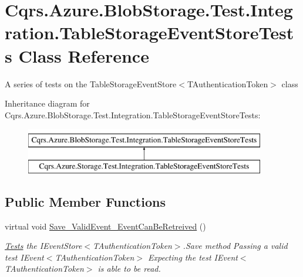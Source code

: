 \hypertarget{classCqrs_1_1Azure_1_1BlobStorage_1_1Test_1_1Integration_1_1TableStorageEventStoreTests}{}\section{Cqrs.\+Azure.\+Blob\+Storage.\+Test.\+Integration.\+Table\+Storage\+Event\+Store\+Tests Class Reference}
\label{classCqrs_1_1Azure_1_1BlobStorage_1_1Test_1_1Integration_1_1TableStorageEventStoreTests}


A series of tests on the Table\+Storage\+Event\+Store$<$\+T\+Authentication\+Token$>$ class  


Inheritance diagram for Cqrs.\+Azure.\+Blob\+Storage.\+Test.\+Integration.\+Table\+Storage\+Event\+Store\+Tests\+:\begin{figure}[H]
\begin{center}
\leavevmode
\includegraphics[height=2.000000cm]{classCqrs_1_1Azure_1_1BlobStorage_1_1Test_1_1Integration_1_1TableStorageEventStoreTests}
\end{center}
\end{figure}
\subsection*{Public Member Functions}
\begin{DoxyCompactItemize}
\item 
virtual void \hyperlink{classCqrs_1_1Azure_1_1BlobStorage_1_1Test_1_1Integration_1_1TableStorageEventStoreTests_a0f88e64f7ff8f84b308d4a8c78222b7e_a0f88e64f7ff8f84b308d4a8c78222b7e}{Save\+\_\+\+Valid\+Event\+\_\+\+Event\+Can\+Be\+Retreived} ()
\begin{DoxyCompactList}\small\item\em \hyperlink{namespaceCqrs_1_1Tests}{Tests} the I\+Event\+Store$<$\+T\+Authentication\+Token$>$.\+Save method Passing a valid test I\+Event$<$\+T\+Authentication\+Token$>$ Expecting the test I\+Event$<$\+T\+Authentication\+Token$>$ is able to be read. \end{DoxyCompactList}\end{DoxyCompactItemize}
